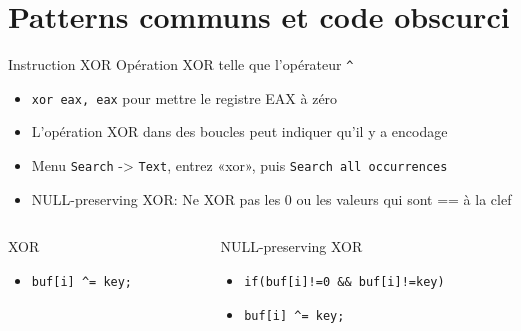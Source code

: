 \documentclass[10pt,xcolor={table,dvipsnames},t]{beamer}
\begin{document}
\section{Patterns communs et code obscurci}

\begin{frame}{Instruction XOR}
    Opération XOR telle que l'opérateur \texttt{\textasciicircum}
    \begin{itemize}
        \item \texttt{xor eax, eax} pour mettre le registre EAX à zéro
        \item L'opération XOR dans des boucles peut indiquer qu'il y a encodage
        \item Menu \texttt{Search} -> \texttt{Text}, entrez «xor», puis \texttt{Search all occurrences}
        \item NULL-preserving XOR: Ne XOR pas les 0 ou les valeurs qui sont == à la clef
    \end{itemize}
    
        \begin{columns}[T]
    
        \begin{column}{0.48\textwidth}
        XOR
        \begin{itemize}
            \item \texttt{buf[i] \textasciicircum= key;}
        \end{itemize}
        \end{column}
        
        \begin{column}{0.48\textwidth}
        NULL-preserving XOR
        \begin{itemize}
            \item \texttt{if(buf[i]!=0 \&\& buf[i]!=key)}
            \item \texttt{\quad buf[i] \textasciicircum= key;}
        \end{itemize}
        \end{column}
    
    \end{columns}
    
\end{frame}
\end{document}
